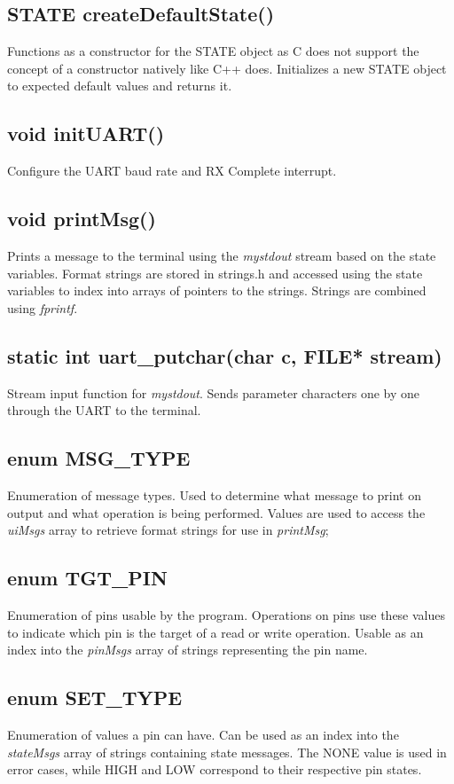 \documentclass[letterpaper,11pt]{texMemo} %
\begin{document}
\subsection*{STATE createDefaultState()}
Functions as a constructor for the STATE object as C does not support the concept of a constructor natively like C++ does. Initializes a new STATE object to expected default values and returns it.
\subsection*{void initUART()}
Configure the UART baud rate and RX Complete interrupt. 
\subsection*{void printMsg()}
Prints a message to the terminal using the \textit{mystdout} stream based on the state variables. Format strings are stored in strings.h and accessed using the state variables to index into arrays of pointers to the strings. Strings are combined using \textit{fprintf}.
\subsection*{static int uart\_putchar(char c, FILE* stream)}
Stream input function for \textit{mystdout}. Sends parameter characters one by one through the UART to the terminal.
\subsection*{enum MSG\_TYPE}
Enumeration of message types. Used to determine what message to print on output and what operation is being performed. Values are used to access the \textit{uiMsgs} array to retrieve format strings for use in \textit{printMsg};
\subsection*{enum TGT\_PIN}
Enumeration of pins usable by the program. Operations on pins use these values to indicate which pin is the target of a read or write operation. Usable as an index into the \textit{pinMsgs} array of strings representing the pin name.
\subsection*{enum SET\_TYPE}
Enumeration of values a pin can have. Can be used as an index into the \textit{stateMsgs} array of strings containing state messages. The NONE value is used in error cases, while HIGH and LOW correspond to their respective pin states.
\end{document}
